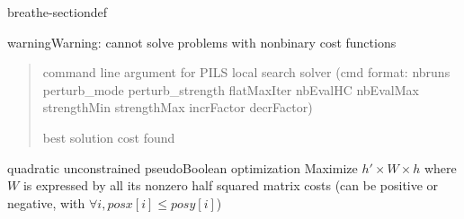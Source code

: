 \documentclass[letterpaper,10pt,openany,oneside,english]{sphinxmanual}
\begin{document}
\begin{fulllineitems}
\begin{sphinxuseclass}{breathe-sectiondef}
\begin{fulllineitems}
\begin{sphinxadmonition}{warning}{Warning:}
\sphinxAtStartPar
cannot solve problems with non\sphinxhyphen{}binary cost functions 
\end{sphinxadmonition}
\begin{quote}\begin{description}
\sphinxAtStartPar
{} \textendash{} command line argument for PILS local search solver (cmd format: nbruns perturb\_mode perturb\_strength flatMaxIter nbEvalHC nbEvalMax strengthMin strengthMax incrFactor decrFactor) 

\sphinxAtStartPar
best solution cost found 

\end{description}\end{quote}

\end{fulllineitems}


\begin{fulllineitems}
\label{\detokenize{ref/ref_cpp:_CPPv4N17WeightedCSPSolver16solve_symmax2satEiiPiPiPdPi}}\label{\detokenize{ref/ref_cpp:_CPPv3N17WeightedCSPSolver16solve_symmax2satEiiPiPiPdPi}}\label{\detokenize{ref/ref_cpp:_CPPv2N17WeightedCSPSolver16solve_symmax2satEiiPiPiPdPi}}\label{\detokenize{ref/ref_cpp:WeightedCSPSolver::solve_symmax2sat__i.i.iP.iP.doubleP.iP}}
\pysigstartsignatures
\pysigstartmultiline
{}
\pysigstopmultiline
\pysigstopsignatures
\sphinxAtStartPar
quadratic unconstrained pseudo\sphinxhyphen{}Boolean optimization Maximize \(h' \times W \times h\) where \(W\) is expressed by all its non\sphinxhyphen{}zero half squared matrix costs (can be positive or negative, with \(\forall i, posx[i] \leq posy[i]\)) 


\end{fulllineitems}
\end{sphinxuseclass}
\end{fulllineitems}
\end{document}
